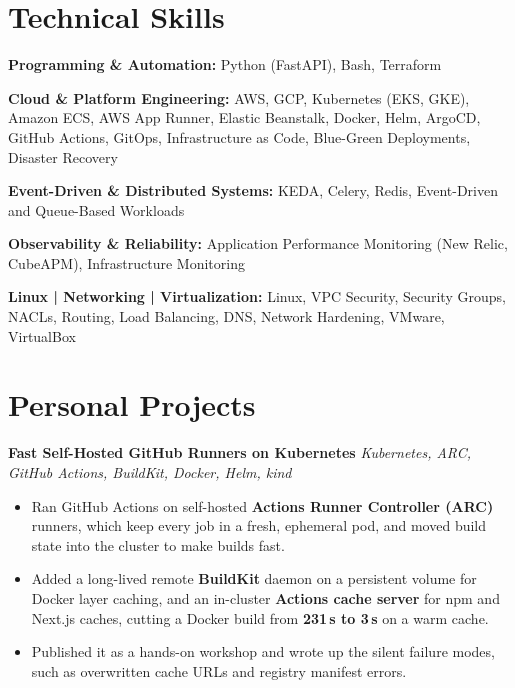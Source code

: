 \documentclass[11pt, a4paper]{article}
\begin{document}
\section*{Technical Skills}

\textbf{Programming \& Automation:} Python (FastAPI), Bash, Terraform

\textbf{Cloud \& Platform Engineering:} AWS, GCP, Kubernetes (EKS, GKE), Amazon ECS, AWS App Runner, Elastic Beanstalk, Docker, Helm, ArgoCD, GitHub Actions, GitOps, Infrastructure as Code, Blue-Green Deployments, Disaster Recovery

\textbf{Event-Driven \& Distributed Systems:} KEDA, Celery, Redis, Event-Driven and Queue-Based Workloads

\textbf{Observability \& Reliability:} Application Performance Monitoring (New Relic, CubeAPM), Infrastructure Monitoring

\textbf{Linux | Networking | Virtualization:} Linux, VPC Security, Security Groups, NACLs, Routing, Load Balancing, DNS, Network Hardening, VMware, VirtualBox


\section*{Personal Projects}

\textbf{Fast Self-Hosted GitHub Runners on Kubernetes} \hfill \textit{Kubernetes, ARC, GitHub Actions, BuildKit, Docker, Helm, kind}

\begin{itemize}[label=-]
    \item Ran GitHub Actions on self-hosted \textbf{Actions Runner Controller (ARC)} runners, which keep every job in a fresh, ephemeral pod, and moved build state into the cluster to make builds fast.

    \item Added a long-lived remote \textbf{BuildKit} daemon on a persistent volume for Docker layer caching, and an in-cluster \textbf{Actions cache server} for npm and Next.js caches, cutting a Docker build from \textbf{231\,s to 3\,s} on a warm cache.

    \item Published it as a hands-on workshop and wrote up the silent failure modes, such as overwritten cache URLs and registry manifest errors.
\end{itemize}
\end{document}

